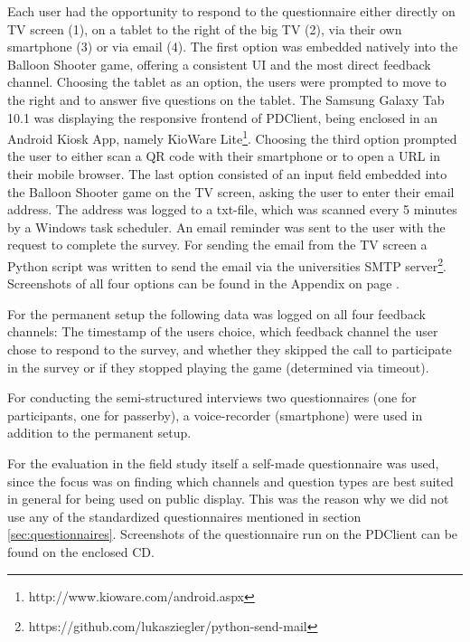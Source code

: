 		Each user had the opportunity to respond to the questionnaire either directly on TV screen (1), on a tablet to the right of the big TV (2), via their own smartphone (3) or via email (4). The first option was embedded natively into the Balloon Shooter game, offering a consistent UI and the most direct feedback channel. Choosing the tablet as an option, the users were prompted to move to the right and to answer five questions on the tablet. The Samsung Galaxy Tab 10.1 was displaying the responsive frontend of PDClient, being enclosed in an Android Kiosk App, namely KioWare Lite\footnote{http://www.kioware.com/android.aspx}. Choosing the third option prompted the user to either scan a QR code with their smartphone or to open a URL in their mobile browser. The last option consisted of an input field embedded into the Balloon Shooter game on the TV screen, asking the user to enter their email address. The address was logged to a txt-file, which was scanned every 5 minutes by a Windows task scheduler. An email reminder was sent to the user with the request to complete the survey. For sending the email from the TV screen a Python script was written to send the email via the universities SMTP server\footnote{https://github.com/lukasziegler/python-send-mail}. Screenshots of all four options can be found in the Appendix on page \pageref{appendix:screenshots-balloon-shooter}.

		For the permanent setup the following data was logged on all four feedback channels: The timestamp of the users choice, which feedback channel the user chose to respond to the survey, and whether they skipped the call to participate in the survey or if they stopped playing the game (determined via timeout). 



		For conducting the semi-structured interviews two questionnaires (one for participants, one for passerby), a voice-recorder (smartphone) were used in addition to the permanent setup.

		For the evaluation in the field study itself a self-made questionnaire was used, since the focus was on finding which channels and question types are best suited in general for being used on public display. This was the reason why we did not use any of the standardized questionnaires mentioned in section \ref{sec:questionnaires}. Screenshots of the questionnaire run on the PDClient can be found on the enclosed CD.




